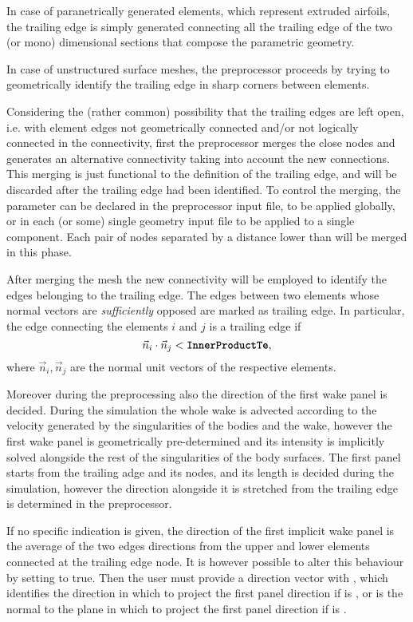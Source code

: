 In case of paranetrically generated elements, which represent extruded airfoils, the trailing edge is simply generated connecting all the trailing edge of the two (or mono) dimensional sections that compose the parametric geometry.

In case of unstructured surface meshes, the preprocessor proceeds by trying to geometrically identify the trailing edge in sharp corners between elements. 

Considering the (rather common) possibility that the trailing edges are left open, i.e. with element edges not geometrically connected and/or not logically connected in the connectivity, first the \DUST preprocessor merges the close nodes and generates an alternative connectivity taking into account the new connections. 
This merging is just functional to the definition of the trailing edge, and will be discarded after the trailing edge had been identified. To control the merging, the parameter  can be declared in the preprocessor input file, to be applied globally, or in each (or some) single geometry input file to be applied to a single component. Each pair of nodes separated by a distance lower than  will be merged in this phase.

After merging the mesh the new connectivity will be employed to identify the edges belonging to the trailing edge. The edges between two elements whose normal vectors are \emph{sufficiently} opposed are marked as trailing edge. In particular, the edge connecting the elements $i$ and $j$ is a trailing edge if 
\begin{equation}
    \Vec{n}_i\cdot\Vec{n}_j < \text{\textbf{\texttt{InnerProductTe}}},
\end{equation}
where $\Vec{n}_i,\Vec{n}_j$ are the normal unit vectors of the respective elements.

Moreover during the preprocessing also the direction of the first wake panel is decided. During the simulation the whole wake is advected according to the velocity generated by the singularities of the bodies and the wake, however the first wake panel is geometrically pre-determined and its intensity is implicitly solved alongside the rest of the singularities of the body surfaces. The first panel starts from the trailing adge and its nodes, and its length is decided during the simulation, however the direction alongside it is stretched from the trailing edge is determined in the preprocessor. 

If no specific indication is given, the direction of the first implicit wake panel is the average of the two edges directions from the upper and lower elements connected at the trailing edge node. It is however possible to alter this behaviour  by setting  to true. Then the user must provide a direction vector with , which identifies the direction in which to project the first panel direction if  is , or is the normal to the plane in which to project the first panel direction if   is .




